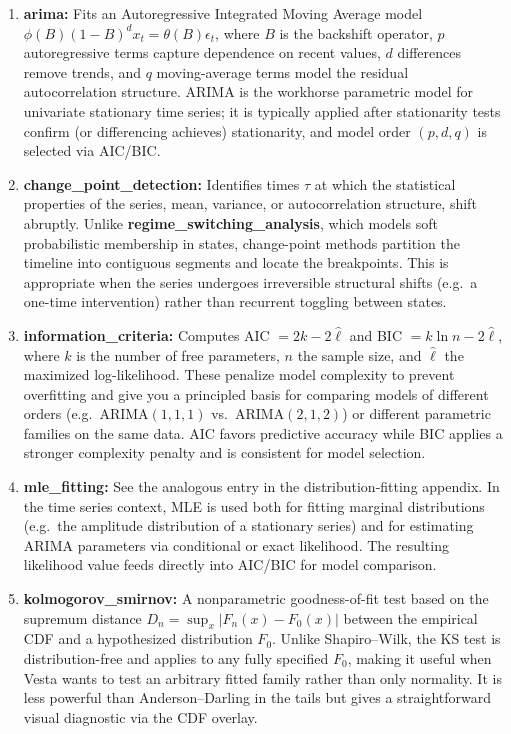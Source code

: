 \documentclass{article}
\newcommand{\method}{{\sc Vesta}}
\begin{document}
\begin{enumerate}
    \item \textbf{arima:} Fits an Autoregressive Integrated Moving Average model $\phi(B)(1-B)^d x_t = \theta(B)\epsilon_t$, where $B$ is the backshift operator, $p$ autoregressive terms capture dependence on recent values, $d$ differences remove trends, and $q$ moving-average terms model the residual autocorrelation structure. ARIMA is the workhorse parametric model for univariate stationary time series; it is typically applied after stationarity tests confirm (or differencing achieves) stationarity, and model order $(p,d,q)$ is selected via AIC/BIC.

    \item \textbf{change\_point\_detection:} Identifies times $\tau$ at which the statistical properties of the series, mean, variance, or autocorrelation structure, shift abruptly. Unlike \textbf{regime\_switching\_analysis}, which models soft probabilistic membership in states, change-point methods partition the timeline into contiguous segments and locate the breakpoints. This is appropriate when the series undergoes irreversible structural shifts (e.g.\ a one-time intervention) rather than recurrent toggling between states.

    \item \textbf{information\_criteria:} Computes AIC $= 2k - 2\hat{\ell}$ and BIC $= k\ln n - 2\hat{\ell}$, where $k$ is the number of free parameters, $n$ the sample size, and $\hat{\ell}$ the maximized log-likelihood. These penalize model complexity to prevent overfitting and give you a principled basis for comparing models of different orders (e.g.\ ARIMA$(1,1,1)$ vs.\ ARIMA$(2,1,2)$) or different parametric families on the same data. AIC favors predictive accuracy while BIC applies a stronger complexity penalty and is consistent for model selection.

    \item \textbf{mle\_fitting:} See the analogous entry in the distribution-fitting appendix. In the time series context, MLE is used both for fitting marginal distributions (e.g.\ the amplitude distribution of a stationary series) and for estimating ARIMA parameters via conditional or exact likelihood. The resulting likelihood value feeds directly into AIC/BIC for model comparison.

    \item \textbf{kolmogorov\_smirnov:} A nonparametric goodness-of-fit test based on the supremum distance $D_n = \sup_x |F_n(x) - F_0(x)|$ between the empirical CDF and a hypothesized distribution $F_0$. Unlike Shapiro--Wilk, the KS test is distribution-free and applies to any fully specified $F_0$, making it useful when \method{} wants to test an arbitrary fitted family rather than only normality. It is less powerful than Anderson--Darling in the tails but gives a straightforward visual diagnostic via the CDF overlay.


\end{enumerate}
\end{document}
